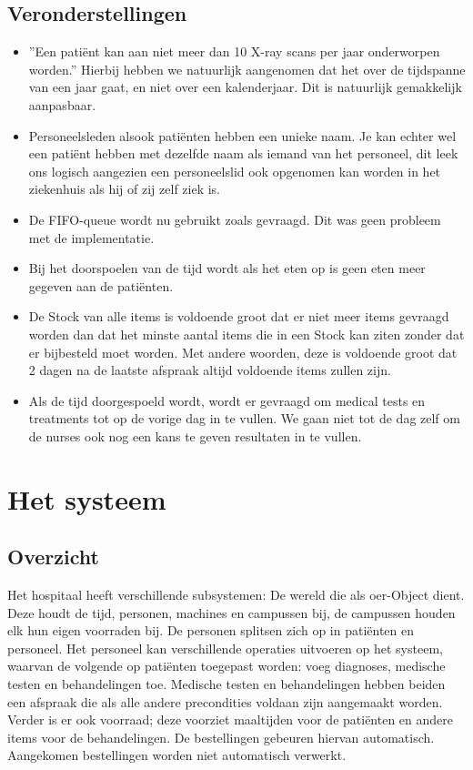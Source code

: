 \documentclass[a4paper]{article}
\begin{document}
\subsection{Veronderstellingen \label{sec:assumptions}}
\begin{itemize}
\item ''Een pati\"ent kan aan niet meer dan 10 X-ray scans per jaar onderworpen worden.'' 
Hierbij hebben we natuurlijk aangenomen dat het over de tijdspanne van een jaar gaat, 
en niet over een kalenderjaar.
Dit is natuurlijk gemakkelijk aanpasbaar.
\item Personeelsleden alsook pati\"enten hebben een unieke naam. 
Je kan echter wel een pati\"ent hebben met dezelfde naam als iemand van het personeel, 
dit leek ons logisch aangezien een personeelslid ook opgenomen kan worden in het ziekenhuis als hij of zij zelf ziek is.
\item De FIFO-queue wordt nu gebruikt zoals gevraagd. Dit was geen probleem met de implementatie.
\item Bij het doorspoelen van de tijd wordt als het eten op is geen eten meer gegeven aan de pati\"enten.
\item De Stock van alle items is voldoende groot dat er niet meer items gevraagd worden dan dat het minste aantal items die in een Stock kan ziten zonder dat er bijbesteld moet worden. Met andere woorden, deze is voldoende groot dat  2 dagen na de laatste afspraak altijd voldoende items zullen zijn.
\item Als de tijd doorgespoeld wordt, wordt er gevraagd om medical tests en treatments tot op de vorige dag in te vullen. We gaan niet tot de dag zelf om de nurses ook nog een kans te geven resultaten in te vullen.
\end{itemize}
\section{Het systeem}
\subsection{Overzicht} %
Het hospitaal heeft verschillende subsystemen: 
De wereld die als oer-Object dient. 
Deze houdt de tijd, personen, machines en campussen bij, de campussen houden elk hun eigen voorraden bij.
De personen splitsen zich op in pati\"enten en personeel. 
Het personeel kan verschillende operaties uitvoeren op het systeem, 
waarvan de volgende op pati\"enten toegepast worden: 
voeg diagnoses, medische testen en behandelingen toe. 
Medische testen en behandelingen hebben beiden een afspraak die als alle andere precondities voldaan zijn aangemaakt worden. 
Verder is er ook voorraad; deze voorziet maaltijden voor de pati\"enten en andere items voor de behandelingen. 
De bestellingen gebeuren hiervan automatisch. Aangekomen bestellingen worden niet automatisch verwerkt.
\end{document}
